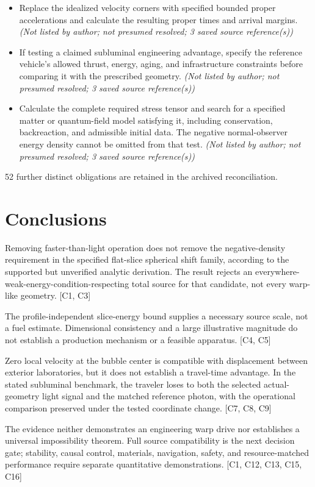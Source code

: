 \documentclass[11pt]{article}
\begin{document}
\begin{itemize}
\item Replace the idealized velocity corners with specified bounded proper accelerations and calculate the resulting proper times and arrival margins. \textit{ (Not listed by author; not presumed resolved; 3 saved source reference(s))}
\item If testing a claimed subluminal engineering advantage, specify the reference vehicle's allowed thrust, energy, aging, and infrastructure constraints before comparing it with the prescribed geometry. \textit{ (Not listed by author; not presumed resolved; 3 saved source reference(s))}
\item Calculate the complete required stress tensor and search for a specified matter or quantum-field model satisfying it, including conservation, backreaction, and admissible initial data. The negative normal-observer energy density cannot be omitted from that test. \textit{ (Not listed by author; not presumed resolved; 3 saved source reference(s))}
\end{itemize}
52 further distinct obligations are retained in the archived reconciliation.
\section{Conclusions}
Removing faster-than-light operation does not remove the negative-density requirement in the specified flat-slice spherical shift family, according to the supported but unverified analytic derivation. The result rejects an everywhere-weak-energy-condition-respecting total source for that candidate, not every warp-like geometry. [C1, C3]

The profile-independent slice-energy bound supplies a necessary source scale, not a fuel estimate. Dimensional consistency and a large illustrative magnitude do not establish a production mechanism or a feasible apparatus. [C4, C5]

Zero local velocity at the bubble center is compatible with displacement between exterior laboratories, but it does not establish a travel-time advantage. In the stated subluminal benchmark, the traveler loses to both the selected actual-geometry light signal and the matched reference photon, with the operational comparison preserved under the tested coordinate change. [C7, C8, C9]

The evidence neither demonstrates an engineering warp drive nor establishes a universal impossibility theorem. Full source compatibility is the next decision gate; stability, causal control, materials, navigation, safety, and resource-matched performance require separate quantitative demonstrations. [C1, C12, C13, C15, C16]
\end{document}
